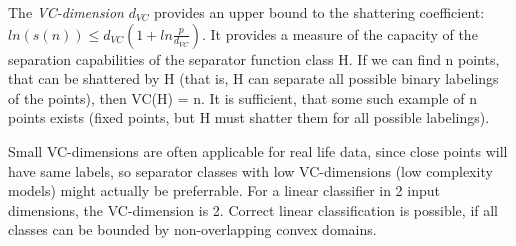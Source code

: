 \documentclass[10pt,a4paper]{article}
\begin{document}
\begin{enumerate}[a)]
The \textit{VC-dimension} $d_{VC}$ provides an upper bound to the shattering coefficient: $ln(s(n)) \leq d_{VC}(1+ln\frac{p}{d_{VC}})$.
It provides a measure of the capacity of the separation capabilities of the separator function class H. If we can find n points, that can be shattered by H (that is, H can separate all possible binary labelings of the points), then VC(H) = n. It is sufficient, that some such example of n points exists (fixed points, but H must shatter them for all possible labelings).

Small VC-dimensions are often applicable for real life data, since close points will have same labels, so separator classes with low VC-dimensions (low complexity models) might actually be preferrable. For a linear classifier in 2 input dimensions, the VC-dimension is 2.
Correct linear classification is possible, if all classes can be bounded by non-overlapping convex domains.

\end{enumerate}
\clearpage
\end{document}
